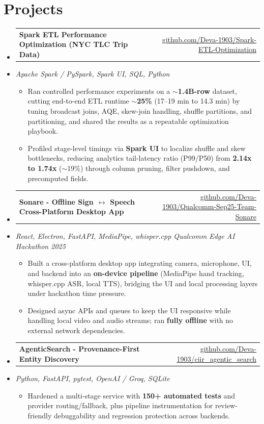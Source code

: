 \documentclass[letterpaper,10pt]{article}
\makeatletter
\newcommand{\resumeItem}[1]{
  \item\small{#1\vspace{-1pt}}
}
\newcommand{\resumeProjectHeading}[2]{
    \item
    \begin{tabular*}{0.985\textwidth}[t]{l@{\extracolsep{\fill}}r}
      \small\textbf{#1} & \small #2 \\
    \end{tabular*}\vspace{-5pt}
}
\newcommand{\resumeProjectSubheading}[1]{
  \vspace{-2pt}\item[] {\small\textcolor{ResumeSlate}{\emph{#1}}}\vspace{-3pt}
}
\newcommand{\resumeSubHeadingListStart}{\begin{itemize}[leftmargin=0.0in, label={}, itemsep=2pt, topsep=2pt]}
\newcommand{\resumeSubHeadingListEnd}{\end{itemize}}
\newcommand{\resumeItemListStart}{\begin{itemize}[leftmargin=0.18in, itemsep=2pt, topsep=1pt]}
\newcommand{\resumeItemListEnd}{\end{itemize}\vspace{-4pt}}
\makeatother
\begin{document}
\section{Projects}
\resumeSubHeadingListStart
  \resumeProjectHeading
    {Spark ETL Performance Optimization (NYC TLC Trip Data)}
    {\href{https://github.com/Deva-1903/Spark-ETL-Optimization}{github.com/Deva-1903/Spark-ETL-Optimization}}
  \resumeProjectSubheading{Apache Spark / PySpark, Spark UI, SQL, Python}
    \resumeItemListStart
      \resumeItem{Ran controlled performance experiments on a \textbf{$\sim$1.4B-row} dataset, cutting end-to-end ETL runtime \textbf{$\sim$25\%} (17--19 min to 14.3 min) by tuning broadcast joins, AQE, skew-join handling, shuffle partitions, and partitioning, and shared the results as a repeatable optimization playbook.}
      \resumeItem{Profiled stage-level timings via \textbf{Spark UI} to localize shuffle and skew bottlenecks, reducing analytics tail-latency ratio (P99/P50) from \textbf{2.14x to 1.74x} ($\sim$19\%) through column pruning, filter pushdown, and precomputed fields.}
    \resumeItemListEnd
  \resumeProjectHeading
    {Sonare - Offline Sign \(\leftrightarrow\) Speech Cross-Platform Desktop App}
    {\href{https://github.com/Deva-1903/Qualcomm-Sep25-Team-Sonare}{github.com/Deva-1903/Qualcomm-Sep25-Team-Sonare}}
  \resumeProjectSubheading{React, Electron, FastAPI, MediaPipe, whisper.cpp \enspace\textbar\enspace Qualcomm Edge AI Hackathon 2025}
    \resumeItemListStart
      \resumeItem{Built a cross-platform desktop app integrating camera, microphone, UI, and backend into an \textbf{on-device pipeline} (MediaPipe hand tracking, whisper.cpp ASR, local TTS), bridging the UI and local processing layers under hackathon time pressure.}
      \resumeItem{Designed async APIs and queues to keep the UI responsive while handling local video and audio streams; ran \textbf{fully offline} with no external network dependencies.}
    \resumeItemListEnd
  \resumeProjectHeading
    {AgenticSearch - Provenance-First Entity Discovery}
    {\href{https://github.com/Deva-1903/ciir_agentic_search}{github.com/Deva-1903/ciir\_agentic\_search}}
  \resumeProjectSubheading{Python, FastAPI, pytest, OpenAI / Groq, SQLite}
    \resumeItemListStart
      \resumeItem{Hardened a multi-stage service with \textbf{150+ automated tests} and provider routing/fallback, plus pipeline instrumentation for review-friendly debuggability and regression protection across backends.}
    \resumeItemListEnd
\resumeSubHeadingListEnd
\vspace{-4pt}
\end{document}

